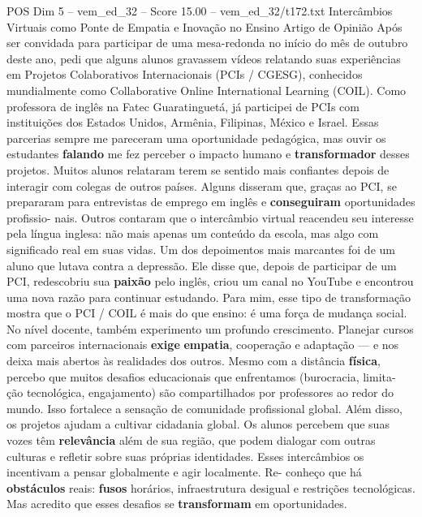 \begin{textsample}{POS Dim 5 – vem\_ed\_32 – Score 15.00 – vem\_ed\_32/t172.txt}  \label{ex:f5_pos_023}
Intercâmbios Virtuais como Ponte de Empatia e Inovação no Ensino Artigo de Opinião Após ser convidada para participar de uma mesa-redonda no início do mês de outubro deste ano, pedi que alguns alunos gravassem vídeos relatando suas experiências em Projetos Colaborativos Internacionais (PCIs / CGESG), conhecidos mundialmente como Collaborative Online International Learning (COIL).
Como professora de inglês na Fatec Guaratinguetá, já participei de PCIs com instituições dos Estados Unidos, Armênia, Filipinas, México e Israel.
Essas parcerias sempre me pareceram uma oportunidade pedagógica, mas ouvir os estudantes \textbf{falando} me fez perceber o impacto humano e \textbf{transformador} desses projetos.
Muitos alunos relataram terem se sentido mais confiantes depois de interagir com colegas de outros países.
Alguns disseram que, graças ao PCI, se prepararam para entrevistas de emprego em inglês e \textbf{conseguiram} oportunidades profissio- nais.
Outros contaram que o intercâmbio virtual reacendeu seu interesse pela língua inglesa: não mais apenas um conteúdo da escola, mas algo com significado real em suas vidas.
Um dos depoimentos mais marcantes foi de um aluno que lutava contra a depressão.
Ele disse que, depois de participar de um PCI, redescobriu sua \textbf{paixão} pelo inglês, criou um canal no YouTube e encontrou uma nova razão para continuar estudando.
Para mim, esse tipo de transformação mostra que o PCI / COIL é mais do que ensino: é uma força de mudança social.
No nível docente, também experimento um profundo crescimento.
Planejar cursos com parceiros internacionais \textbf{exige} \textbf{empatia}, cooperação e adaptação — e nos deixa mais abertos às realidades dos outros.
Mesmo com a distância \textbf{física}, percebo que muitos desafios educacionais que enfrentamos (burocracia, limita- ção tecnológica, engajamento) são compartilhados por professores ao redor do mundo.
Isso fortalece a sensação de comunidade profissional global.
Além disso, os projetos ajudam a cultivar cidadania global.
Os alunos percebem que suas vozes têm \textbf{relevância} além de sua região, que podem dialogar com outras culturas e refletir sobre suas próprias identidades.
Esses intercâmbios os incentivam a pensar globalmente e agir localmente.
Re- conheço que há \textbf{obstáculos} reais: \textbf{fusos} horários, infraestrutura desigual e restrições tecnológicas.
Mas acredito que esses desafios se \textbf{transformam} em oportunidades.

\end{textsample}

